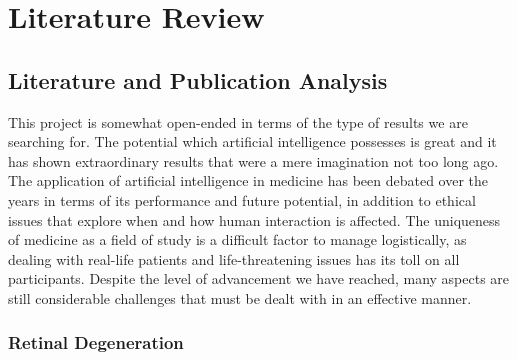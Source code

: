 \documentclass[a4paper]{article}
\begin{document}
\section{Literature Review}

    \subsection{Literature and Publication Analysis}
        This project is somewhat open-ended in terms of the type of results we are searching for. The potential which artificial intelligence possesses is great and it has shown extraordinary results that were a mere imagination not too long ago. The application of artificial intelligence in medicine has been debated over the years in terms of its performance and future potential, in addition to ethical issues that explore when and how human interaction is affected. The uniqueness of medicine as a field of study is a difficult factor to manage logistically, as dealing with real-life patients and life-threatening issues has its toll on all participants. Despite the level of advancement we have reached, many aspects are still considerable challenges that must be dealt with in an effective manner.
        \vspace{3mm}

        \subsubsection{Retinal Degeneration}
\end{document}
